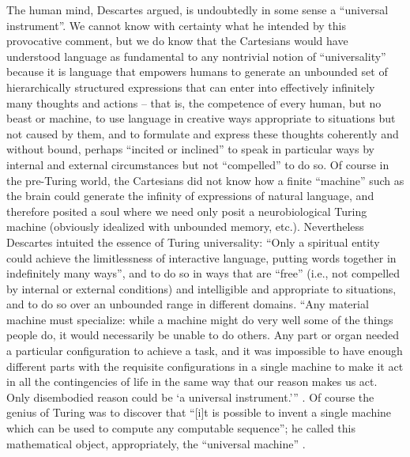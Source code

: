 \documentclass[output=paper]{langsci/langscibook}
\begin{document}
The human mind, Descartes argued, is undoubtedly in some sense a “universal
instrument”. We cannot know with certainty what he intended by this provocative
comment, but we do know that the Cartesians would have understood language as
fundamental to any nontrivial notion of “universality” because it is language
that empowers humans to generate an unbounded set of hierarchically structured
expressions that can enter into effectively infinitely many thoughts and
actions – that is, the competence of every human, but no beast or machine, to
use language in creative ways appropriate to situations but not caused by them,
and to formulate and express these thoughts coherently and without bound,
perhaps “incited or inclined” to speak in particular ways by internal and
external circumstances but not “compelled” to do so. Of course in the
pre-Turing world, the Cartesians did not know how a finite “machine” such as
the brain could generate the infinity of expressions of natural language, and
therefore posited a soul where we need only posit a neurobiological Turing
machine (obviously idealized with unbounded memory, etc.). Nevertheless
Descartes intuited the essence of Turing universality: “Only a spiritual entity
could achieve the limitlessness of interactive language, putting words together
in indefinitely many ways”, and to do so in ways that are “free” (i.e., not
compelled by internal or external conditions) and intelligible and appropriate
to situations, and to do so over an unbounded range in different domains. “Any
material machine must specialize: while a machine might do very well some of
the things people do, it would necessarily be unable to do others. Any part or
organ needed a particular configuration to achieve a task, and it was
impossible to have enough different parts with the requisite configurations in
a single machine to make it act in all the contingencies of life in the same
way that our reason makes us act. Only disembodied reason could be ‘a
universal instrument.’” \citep[63]{Riskin2017}. Of course the genius of Turing
was to discover that “[i]t is possible to invent a single machine which can be
used to compute any computable sequence”; he called this mathematical object,
appropriately, the “universal machine” \citep[243]{Turing1936}.
\end{document}
